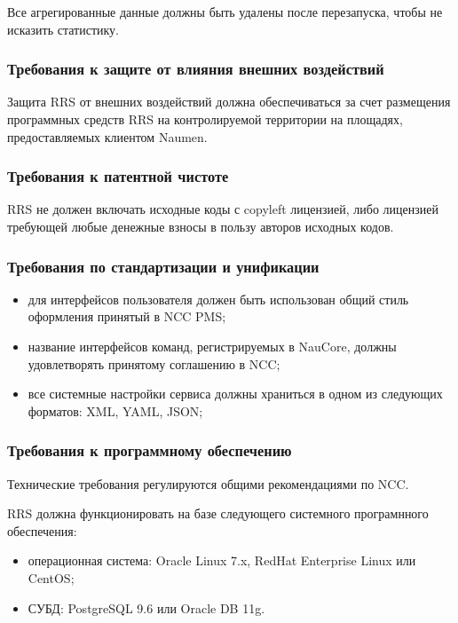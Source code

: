Все агрегированные данные должны быть удалены после перезапуска, чтобы не исказить статистику.

\subsubsection{Требования к защите от влияния внешних воздействий}

Защита RRS от внешних воздействий должна обеспечиваться за счет размещения программных средств RRS на контролируемой территории на площадях, предоставляемых клиентом Naumen.

\subsubsection{Требования к патентной чистоте}

RRS не должен включать исходные коды с copyleft лицензией, либо лицензией требующей любые денежные взносы в пользу авторов исходных кодов.

\subsubsection{Требования по стандартизации и унификации}

\begin{itemize}
    \item для интерфейсов пользователя должен быть использован общий стиль оформления принятый в NCC PMS;
    \item название интерфейсов команд, регистрируемых в NauCore, должны удовлетворять принятому соглашению в NCC;
    \item все системные настройки сервиса должны храниться в одном из следующих форматов: XML, YAML, JSON\@;
\end{itemize}

\subsubsection{Требования к программному обеспечению}
\label{subsubsec:требования-к-программному-обеспечению}

Технические требования регулируются общими рекомендациями по NCC\@.

RRS должна функционировать на базе следующего системного програмнного обеспечения:
\begin{itemize}
    \item операционная система: Oracle Linux 7.x, RedHat Enterprise Linux или CentOS;
    \item СУБД: PostgreSQL 9.6 или Oracle DB 11g.
\end{itemize}

